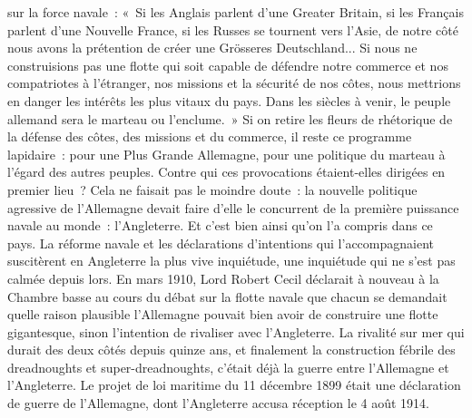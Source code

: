 \documentclass[french,twoside]{book} %
\begin{document}
sur la force navale : « Si les Anglais parlent d’une Greater Britain, si les Français parlent d’une Nouvelle France, si les Russes se tournent vers l’Asie, de notre côté nous avons la prétention de créer une Grösseres Deutschland... Si nous ne construisions pas une flotte qui soit capable de défendre notre commerce et nos compatriotes à l’étranger, nos missions et la sécurité de nos côtes, nous mettrions en danger les intérêts les plus vitaux du pays. Dans les siècles à venir, le peuple allemand sera le marteau ou l’enclume. » Si on retire les fleurs de rhétorique de la défense des côtes, des missions et du commerce, il reste ce programme lapidaire : pour une Plus Grande Allemagne, pour une politique du marteau à l’égard des autres peuples. Contre qui ces provocations étaient-elles dirigées en premier lieu ? Cela ne faisait pas le moindre doute : la nouvelle politique agressive de l’Allemagne devait faire d’elle le concurrent de la première puissance navale au monde : l’Angleterre. Et c’est bien ainsi qu’on l’a compris dans ce pays. La réforme navale et les déclarations d’intentions qui l’accompagnaient suscitèrent en Angleterre la plus vive inquiétude, une inquiétude qui ne s’est pas calmée depuis lors. En mars 1910, Lord Robert Cecil déclarait à nouveau à la Chambre basse au cours du débat sur la flotte navale que chacun se demandait quelle raison plausible l’Allemagne pouvait bien avoir de construire une flotte gigantesque, sinon l’intention de rivaliser avec l’Angleterre. La rivalité sur mer qui durait des deux côtés depuis quinze ans, et finalement la construction fébrile des dreadnoughts et super-dreadnoughts, c’était déjà la guerre entre l’Allemagne et l’Angleterre. Le projet de loi maritime du 11 décembre 1899 était une déclaration de guerre de l’Allemagne, dont l’Angleterre accusa réception le 4 août 1914.\par
\end{document}
